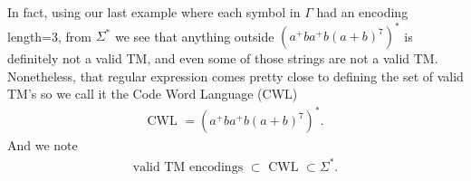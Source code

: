 \documentclass{report}
\begin{document}
\begin{itemize}
\begin{itemize}
            \end{itemize}
            \bigbreak \noindent 
            In fact, using our last example where each symbol in $\Gamma$ had an encoding length=3, from $\Sigma^{*} $ we see that anything outside $(a^{+}ba^{+}b(a+b)^{7})^{*} $ is definitely not a valid TM, and even some of those strings are not a valid TM.
            \bigbreak \noindent 
            Nonetheless, that regular expression comes pretty close to defining the set of valid TM’s so we call it the Code Word Language (CWL)
            \begin{align*}
                \text{CWL } = (a^{+}ba^{+}b(a+b)^{7})^{*}
            .\end{align*}
            \bigbreak \noindent 
            And we note
            \begin{align*}
                \text{valid TM encodings } \subset   \text{ CWL } \subset \Sigma^{*}
            .\end{align*}
        

    \end{itemize}

    \pagebreak 
\end{document}
